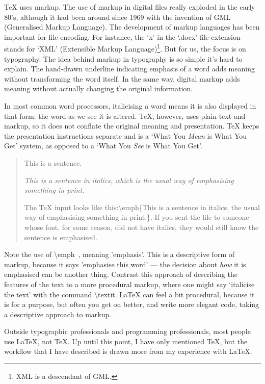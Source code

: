 \documentclass[11pt, oneside]{memoir}
\begin{document}
TeX uses markup. The use of markup in digital files really exploded in the early 80's, although it had been around since 1969 with the invention of GML (Generalised Markup Language). The development of markup languages has been important for file encoding. For instance, the `x' in the `.docx' file extension stands for `XML' (Extensible Markup Language)\footnote{XML is a descendant of GML.}. But for us, the focus is on typography. The idea behind markup in typography is so simple it's hard to explain. The hand-drawn underline indicating emphasis of a word adds meaning without transforming the word itself. In the same way, digital markup adds meaning without actually changing the original information. 

In most common word processors, italicising a word means it is also displayed in that form: the word as we see it is altered. TeX, however, uses plain-text and markup, so it does not conflate the original meaning and presentation. TeX keeps the presentation instructions separate and is a `What You \emph{Mean} is What You Get' system, as opposed to a `What You \emph{See} is What You Get'.

\begin{quotation}
This is a sentence. 

\emph{This is a sentence in italics, which is the usual way of emphasising something in print.}

The TeX input looks like this:\gc \textbackslash emph\{This is a sentence in italics, the usual way of emphasising something in print.\}. \normalfont If you sent the file to someone whose font, for some reason, did not have italics, they would still know the sentence is emphasised.
\end{quotation}

Note the use of \gc \textbackslash emph\ \normalfont , meaning 'emphasis'. This is a descriptive form of markup, because it says 'emphasise this word' — the decision about \emph{how} it is emphasised can be another thing. Contrast this approach of describing the features of the text to a more procedural markup, where one might say `italicise the text' with the command \gc \textbackslash textit. \normalfont LaTeX can feel a bit procedural, because it is for a purpose, but often you get on better, and write more elegant code, taking a descriptive approach to markup.

Outside typographic professionals and programming professionals, most people use \LaTeX{}, not \TeX{}. Up until this point, I have only mentioned TeX, but the workflow that I have described is drawn more from my experience with LaTeX.
\end{document}
